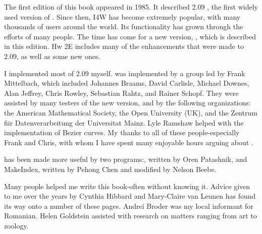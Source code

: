 The first edition of this book appeared in 1985. It described \ltx{} 2.09 , the first widely 
used version of \ltx{}. Since then, I4W has become extremely popular, with many thousands of users 
around the world. Its functionality has grown through the efforts of many people. The time has come for a new version,
\ltxee{}, which is described in this edition. Hw 2E includes many of the enhancements that were made to \ltx{} 2.09, 
as well as some new ones.



I implemented most of \ltx{} 2.09 myself. \ltxee{} was implemented by a group led by Frank Mittelbach, 
which included Johannes Braams, David Carlisle, Michael Downes, Alan Jeffrey, Chris Rowley, 
Sebastian Rahtz, and Rainer Schopf. They were assisted by many testers of the new version, and by
the following organizations: the American Mathematical Society, the Open University (UK), and the 
Zentrum fiir Datenverarbeitung der Universitat Mainz. Lyle Ramshaw helped with the implementation 
of Bezier curves. My thanks to all of these people-especially Frank and Chris, with whom I have spent many
enjoyable hours arguing about \ltx{}. 

\ltx{} has been made more useful by two programs:, written by Oren Patashnik, and MakeIndex, 
written by Pehong Chen and modified by Nelson Beebe.

Many people helped me write this book-often without knowing it. Advice
given to me over the years by Cynthia Hibbard and Mary-Claire van Leunen
has found its way onto a number of these pages. Andrei Broder was my local
informant for Romanian. Helen Goldstein assisted with research on matters
ranging from art to zoology.

